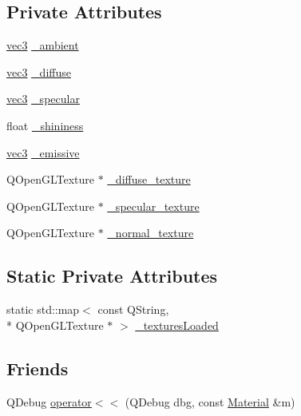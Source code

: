 \subsection*{Private Attributes}
\begin{DoxyCompactItemize}
\item 
\hyperlink{structvec3}{vec3} \hyperlink{class_material_a4c29044a3f7e8008eb3a0666c4ce09b9}{\+\_\+ambient}
\item 
\hyperlink{structvec3}{vec3} \hyperlink{class_material_a402005729d7d5a147d51dfcd691d2ffa}{\+\_\+diffuse}
\item 
\hyperlink{structvec3}{vec3} \hyperlink{class_material_af3e2839f5a712fba28111e00783af70f}{\+\_\+specular}
\item 
float \hyperlink{class_material_ae3f666b9de93b770232ebb5b1b3ee47e}{\+\_\+shininess}
\item 
\hyperlink{structvec3}{vec3} \hyperlink{class_material_a7c2eb5e499b3f46ec6e9d62f02653879}{\+\_\+emissive}
\item 
Q\+Open\+G\+L\+Texture $\ast$ \hyperlink{class_material_a522d07896a1363e987d09d8e4b66c156}{\+\_\+diffuse\+\_\+texture}
\item 
Q\+Open\+G\+L\+Texture $\ast$ \hyperlink{class_material_a15711d6d794b6ea122e38738fa73ba8a}{\+\_\+specular\+\_\+texture}
\item 
Q\+Open\+G\+L\+Texture $\ast$ \hyperlink{class_material_add78622071d92485dd37dbd1934453b3}{\+\_\+normal\+\_\+texture}
\end{DoxyCompactItemize}
\subsection*{Static Private Attributes}
\begin{DoxyCompactItemize}
\item 
static std\+::map$<$ const Q\+String, \\*
Q\+Open\+G\+L\+Texture $\ast$ $>$ \hyperlink{class_material_a9ccbb6b22b224284050b4d6c172829fc}{\+\_\+textures\+Loaded}
\end{DoxyCompactItemize}
\subsection*{Friends}
\begin{DoxyCompactItemize}
\item 
Q\+Debug \hyperlink{class_material_a6796ee577479f67459444fcd552e6c05}{operator$<$$<$} (Q\+Debug dbg, const \hyperlink{class_material}{Material} \&m)
\end{DoxyCompactItemize}


